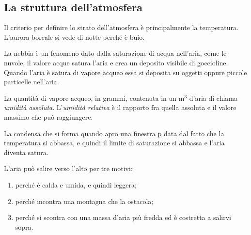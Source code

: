 \documentclass[a4paper]{article}
\begin{document}
\subsection{La struttura dell'atmosfera} %

Il criterio per definire lo strato dell'atmosfera è principalmente la temperatura.
L'aurora boreale si vede di notte perché è buio.

La nebbia è un fenomeno dato dalla saturazione di acqua nell'aria,
come le nuvole, il valore acque satura l'aria e crea un deposito visibile di goccioline.
Quando l'aria è satura di vapore acqueo essa si deposita su oggetti oppure piccole particelle nell'aria.

La quantità di vapore acqueo, in grammi, contenuta in un m\({}^3\) d'aria di chiama \textit{umidità assoluta}.
L'\textit{umidità relativa} è il rapporto fra quella assoluta e il valore massimo che può raggiungere.

La condensa che si forma quando apro una finestra p data dal fatto che la temperatura si abbassa, e quindi
il limite di saturazione si abbassa e l'aria diventa satura.

L'aria può salire verso l'alto per tre motivi:
\begin{enumerate}
    \item perché è calda e umida, e quindi leggera;
    \item perché incontra una montagna che la ostacola;
    \item perché si scontra con una massa d'aria più fredda ed è costretta a salirvi sopra.
\end{enumerate}
\end{document}
